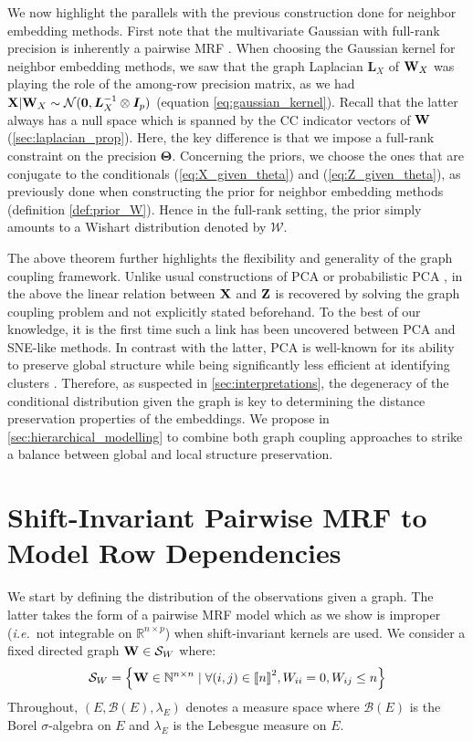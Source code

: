 We now highlight the parallels with the previous construction done for neighbor embedding methods. First note that the multivariate Gaussian with full-rank precision is inherently a pairwise MRF \citep{rue2005gaussian}. When choosing the Gaussian kernel for neighbor embedding methods, we saw that the graph Laplacian $\bm{L}_{X}$ of $\mathbf{W}_{X}$ was playing the role of the among-row precision matrix, as we had $\mathbf{X} | \mathbf{W}_{X} \sim \mathcal{N}(\bm{0}, \bm{L}_{X}^{-1} \otimes \bm{I}_p)$ (equation \ref{eq:gaussian_kernel}). Recall that the latter always has a null space which is spanned by the CC indicator vectors of $\mathbf{W}$ (\cref{sec:laplacian_prop}). Here, the key difference is that we impose a full-rank constraint on the precision $\bm{\Theta}$. Concerning the priors, we choose the ones that are conjugate to the conditionals (\ref{eq:X_given_theta}) and (\ref{eq:Z_given_theta}), as previously done when constructing the prior for neighbor embedding methods (definition \ref{def:prior_W}). Hence in the full-rank setting, the prior simply amounts to a Wishart distribution denoted by $\mathcal{W}$.

The above theorem further highlights the flexibility and generality of the graph coupling framework. Unlike usual constructions of PCA or probabilistic PCA \citep{tipping1999probabilistic}, in the above the linear relation between $\mathbf{X}$ and $\mathbf{Z}$ is recovered by solving the graph coupling problem and not explicitly stated beforehand. To the best of our knowledge, it is the first time such a link has been uncovered between PCA and SNE-like methods. In contrast with the latter, PCA is well-known for its ability to preserve global structure while being significantly less efficient at identifying clusters \citep{anowar2021conceptual}. Therefore, as suspected in \cref{sec:interpretations}, the degeneracy of the conditional distribution given the graph is key to determining the distance preservation properties of the embeddings. We propose in \cref{sec:hierarchical_modelling} to combine both graph coupling approaches to strike a balance between global and local structure preservation.

\section {Shift-Invariant Pairwise MRF to Model Row Dependencies} \label{sec:graph_structure}

We start by defining the distribution of the observations given a graph. The latter takes the form of a pairwise MRF model which as we show is improper (\textit{i.e.}\ not integrable on $\mathbb{R}^{n \times p}$) when shift-invariant kernels are used. We consider a fixed directed graph $\mathbf{W} \in \mathcal{S}_{W}$ where:
$$\mathcal{S}_{W} = \left\{\mathbf{W} \in \mathbb{N}^{n \times n} \mid \forall (i,j) \in {[\![n]\!]}^2, W_{ii}=0, W_{ij} \leq n \right\}$$
Throughout, $(E, \mathcal{B}(E), \lambda_E)$ denotes a measure space where $\mathcal{B}(E)$ is the Borel $\sigma$-algebra on $E$ and $\lambda_E$ is the Lebesgue measure on $E$.

